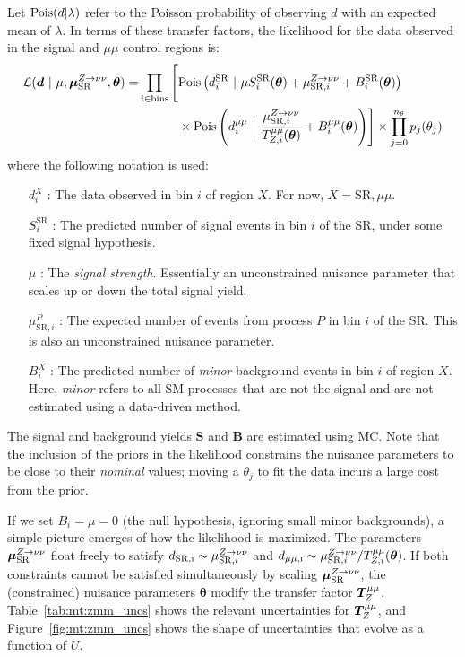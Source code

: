 Let $\mathrm{Pois}(d|\lambda)$ refer to the Poisson probability of observing $d$ with an expected mean of $\lambda$.
In terms of these transfer factors, the likelihood for the data observed in the signal and $\mu\mu$ control regions is:
\begin{align}
    \mathcal{L}(\bm{d} ~|~ \mu,\muz,\bm{\theta}) = & \prod_{i\in\mathrm{bins}} \left[
    \pois\left(d^{\mathrm{SR}}_{i} ~|~ \mu S^{\mathrm{SR}}_{i}(\bm\theta)  + \muzi + B^{\mathrm{SR}}_{i}(\bm\theta)\right) \vphantom{\frac{\muzi}{\Ti{\mu\mu}{Z}(\bm\theta)}}\right. \nonumber \\
    & \left. \phantom{\prod_{i\in\mathrm{bins}}\Big[} \times \pois\left(d^{\mu\mu}_i~\Big|~ \frac{\muzi}{\Ti{\mu\mu}{Z}(\bm\theta)} + B^{\mu\mu}_i(\bm\theta) \right)\right]  \times  \prod_{j=0}^{n_\theta} p_j(\theta_j)
    \label{eq:mt:lhood}
\end{align}
where the following notation is used:
\begin{itemize}
    \item[$d^X_i$]: The data observed in bin $i$ of region $X$. For now, $X=\mathrm{SR},\mu\mu$.
    \item[$S^\mathrm{SR}_i$]: The predicted number of signal events in bin $i$ of the SR, under some fixed signal hypothesis.
    \item[$\mu$]: The \emph{signal strength}. Essentially an unconstrained nuisance parameter that scales up or down the total signal yield.
    \item[$\mu_{\mathrm{SR},i}^P$]: The expected number of events from process $P$ in bin $i$ of the SR. This is also an unconstrained nuisance parameter.
    \item[$B^X_i$]: The predicted number of \emph{minor} background events in bin $i$ of region $X$. Here, \emph{minor} refers to all SM processes that are not the signal and are not estimated using a data-driven method.
\end{itemize}
The signal and background yields $\bm{S}$ and $\bm{B}$ are estimated using MC.
Note that the inclusion of the priors in the likelihood constrains the nuisance parameters to be close to their \emph{nominal} values; moving a $\theta_j$ to fit the data incurs a large cost from the prior.

If we set $B_i = \mu = 0$ (the null hypothesis, ignoring small minor backgrounds), a simple picture emerges of how the likelihood is maximized.
The parameters $\bm{\mu}_{\mathrm{SR}}^{Z\rightarrow\nu\nu}$ float freely to satisfy $d_\mathrm{SR,i} \sim \mu_{\mathrm{SR},i}^{Z\rightarrow\nu\nu}$ and $d_\mathrm{\mu\mu,i}\sim \mu_{\mathrm{SR},i}^{Z\rightarrow\nu\nu} / {T}^{\mu\mu}_{Z,i}(\bm\theta)$.
If both constraints cannot be satisfied simultaneously by scaling $\bm{\mu}_{\mathrm{SR}}^{Z\rightarrow\nu\nu}$, the (constrained) nuisance parameters $\bm\theta$ modify the transfer factor $\bm{T}^{\mu\mu}_{Z}$.
Table~\ref{tab:mt:zmm_uncs} shows the relevant uncertainties for $\bm{T}^{\mu\mu}_{Z}$, and Figure~\ref{fig:mt:zmm_uncs} shows the shape of uncertainties that evolve as a function of $U$.

